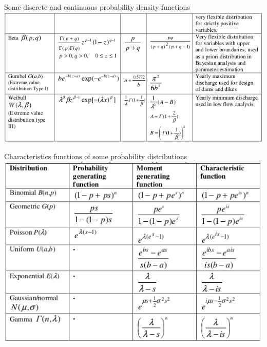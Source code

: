 \documentclass[8pt]{beamer}
\begin{document}
\begin{frame}{Some discrete and continuous probability density functions} 
    \centering
\includegraphics[width=0.95\linewidth]{taBi32b.png}  %
\end{frame}

\begin{frame}{Characteristics functions of some  probability distributions} 
    \centering
\includegraphics[width=0.95\linewidth]{taBi33.png}  %
\end{frame}
\end{document}
